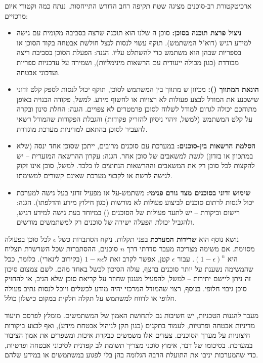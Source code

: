ארכיטקטורת רב-סוכנים מציגה שטח תקיפה רחב הדורש התייחסות. ננתח כמה וקטורי איום מרכזיים:
\begin{itemize}
\item \textbf{ניצול פרצת תוכנה בסוכן:} סוכן ה שלנו הוא תוכנה שרצה בסביבה מקומית עם גישה למידע רגיש (דוא"ל המשתמש). תוקף עשוי לנסות לנצל חולשת אבטחה בקוד הסוכן או בספריות שבהן הוא משתמש כדי להשתלט עליו. הגנה: הפעלת הסוכן בסביבת ריצה מבודדת (כגון מכולה ייעודית עם הרשאות מינימליות), ושמירה על עדכניות ספריות ועדכוני אבטחה.
\item \textbf{הונאת המתווך ():} מכיוון ש מתווך בין המשתמש לסוכן, תוקף יכול לנסות לספק קלט זדוני שישכנע את המודל לבצע פעולות לא רצויות או לחשוף מידע. למשל, פקודה הבנויה באופן מתוחכם יכולה לגרום למודל לשלוח לסוכן פרמטרים לא צפויים. הגנה: החלת סינון ובקרה על קלט המשתמש (למשל, זיהוי ניסיון להזריק פקודות) והגבלת הפקודות שהמודל רשאי להעביר לסוכן בהתאם למדיניות מערכת מוגדרת.
\item \textbf{הסלמת הרשאות בין-סוכנים:} במערכת עם סוכנים מרובים, ייתכן שסוכן אחד ינסה (שלא במתכוון או בזדון) לגשת למשאבים של סוכן אחר. הגנה: עקרון ההרשאה המזערית – יש להקצות לכל סוכן רק את המשאבים וההרשאות הנחוצים לו בלבד. למשל, סוכן  אינו זקוק לגישה לרשת או לקבצי מערכת שאינם קשורים למשימתו.
\item \textbf{שימוש זדוני בסוכנים מצד גורם פנימי:} משתמש-על או מפעיל זדוני בעל גישה למערכת יכול לנסות לרתום סוכנים לביצוע פעולות לא מורשות (כגון חילוץ מידע והדלפתו). הגנה: רישום וביקורת – יש לתעד פעולות של הסוכנים () במיוחד בעת גישה למידע רגיש, ולהגביל יכולת הפעלה ישירה של סוכנים רק למשתמשים מורשים.
\end{itemize}

נושא נוסף הוא \textbf{שרידות המערכת} בפני תקלות. ניקח הסתברות כשל $\epsilon$ לכל סוכן בפעולה מסוימת. אם משימה מצריכה מעבר סדרתי דרך $n$ סוכנים, ההסתברות שכל השרשרת תצליח היא $(1-\epsilon)^n$. עבור $\epsilon$ קטן, אפשר לקרב זאת ל\en{-}$1 - n\epsilon$ (בקירוב לינארי). כלומר, ככל שהמשימה נשענת על יותר סוכנים ברצף, עולה הסיכון לכשל באחד מהם. לשם צמצום סיכון זה ניתן ליישם יתירות – למשל, להפעיל מנגנון שחוזר על קריאת סוכן שלא הגיב, או להחזיק סוכן גיבוי חלופי. בנוסף, רצוי שהמודל המרכזי יהיה מודע לכשלים ויוכל לנסות נתיב פעולה חלופי או לדווח למשתמש על תקלה חלקית במקום כישלון כולל.

מעבר להגנות הטכניות, יש חשיבות גם לתחושת האמון של המשתמשים. מומלץ לפרסם תיעוד מדיניות אבטחה ופרטיות, לעמוד בתקנים (כגון תקן  לניהול אבטחת מידע), ואף לבצע ביקורות חיצוניות על מערך הסוכנים. צעדים אלו משמשים כבקרת איכות ומשפרים את אמון הציבור במערכת. בסיכומו של דבר, אימוץ סוכני  מצריך תשומת לב קפדנית לסיכוני אבטחה ופרטיות, כדי שהמערכות יניבו את התועלת הרבה הגלומה בהן בלי לפגוע במשתמשים או במידע שלהם.
